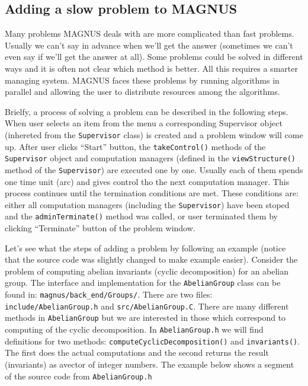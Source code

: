 \documentclass[12pt]{article}
\def\magnus{MAGNUS }
\begin{document}
\subsection{Adding a slow problem to \magnus}

Many problems \magnus deals with are more complicated than
fast problems. Usually we can't say
in advance when we'll get the answer (sometimes we can't even say if we'll get
the answer at all). Some problems could be solved in different ways and it is
often
not clear which method is better. All this requires a smarter managing system.
\magnus
faces these problems by running algorithms in parallel and allowing the user to
distribute resources among the algorithms.

Brielfy, a process of solving a problem can be described in the
following steps. When user selects an item from the menu a corresponding
Supervisor object (inhereted from the {\tt Supervisor} class) is created and
a problem window will come up.
After user clicks ``Start'' button, the {\tt takeControl()} methods of the
{\tt Supervisor}
object and computation managers (defined in the
{\tt viewStructure()} method of
the {\tt Supervisor}) are  executed one by one. Usually each of them spends one time
unit (arc) and gives control tho the next computation manager. This process
continues until the termination conditions are met. These  conditions are:
either all computation managers (including the {\tt Supervisor}) have been stoped and
the {\tt adminTerminate()} method was called, or user terminated them by clicking
``Terminate'' button of the problem window.


Let's see what the steps of adding a problem  by following an example (notice
that the source code was slightly changed to make example easier).
Consider the problem of computing abelian invariants (cyclic decomposition) for
an abelian group.  The interface and implementation for the {\tt AbelianGroup} class can be
found in: {\tt magnus/back\_end/Groups/}.
There are two files: {\tt include/AbelianGroup.h} and
{\tt src/AbelianGroup.C}.
There are many different methods in {\tt AbelianGroup} but we are
interested in those  which correspond to computing of the cyclic decomposition.
In {\tt AbelianGroup.h} we will find definitions for   two methods:
{\tt computeCyclicDecomposition()} and  {\tt invariants()}.
The first does the actual computations and the second returns the result
(invariants) as avector of integer numbers.
The example below shows  a segment of the source code from {\tt AbelianGroup.h}
\end{document}
